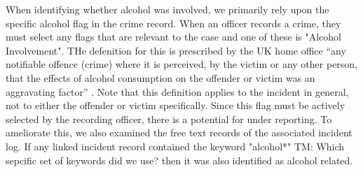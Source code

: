 \documentclass[12pt, a4paper]{article}
\newcommand{\TM}[1]{\textcolor{springgreen3}{TM: #1}}
\begin{document}
When identifying whether alcohol was involved, we primarily rely upon the specific alcohol flag in the crime record. When an officer records a crime, they must select any flags that are relevant to the case and one of these is "Alcohol Involvement". THe defenition for this is prescribed by the UK home office ``any notifiable offence (crime) where it is perceived, by the victim or any other person, that the effects of alcohol consumption on the offender or victim was an aggravating factor'' \cite{Office2019}. Note that this definition applies to the incident in general, not to either the offender or victim specifically. Since this flag must be actively selected by the recording officer, there is a potential for under reporting. To ameliorate this, we also examined the free text records of the associated incident log. If any linked incident record contained the keyword "alcohol*" \TM{Which sepcific set of keywords did we use?} then it was also identified as alcohol related.
 
 
 
\end{document}
